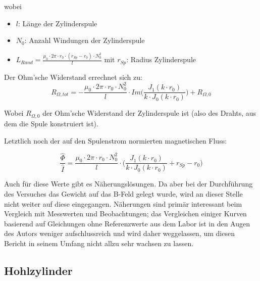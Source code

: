 wobei
\begin{itemize}
    \item[]
        $l$: L\"ange der Zylinderspule
    \item[]
        $N_0$: Anzahl Windungen der Zylinderspule
    \item[]
        $L_{Rand} = \frac{\mu_0 \cdot 2\pi \cdot r_0 \cdot (r_{Sp} - r_0) \cdot N_0^2}{l}$ mit $r_{Sp}$: Radius Zylinderspule
\end{itemize}

Der Ohm'sche Widerstand errechnet sich zu:
\begin{equation}
    \label{eq:vollzylinder:RExact}
    R_{\Omega,tot} = - \frac{\mu_0 \cdot 2\pi \cdot r_0 \cdot N_0^2}{l} \cdot Im \Biggl(\frac{J_1 (k \cdot r_0)}{k \cdot J_0 (k \cdot r_0)} \Biggr) + R_{\Omega,0}
\end{equation}

Wobei $R_{\Omega,0}$ der  Ohm'sche Widerstand der Zylinderspule  ist (also des
Drahts, aus dem die Spule konstruiert ist).

Letztlich noch der auf den Spulenstrom normierten magnetischen Fluss:

\begin{equation}
    \label{eq:vollzylinder:phiExact}
    \frac{\hat{\Phi}}{\hat{I}} = \frac{\mu_0 \cdot 2\pi \cdot r_0 \cdot N_0^2}{l} \cdot \Biggl(\frac{J_1 (k \cdot r_0)}{k \cdot J_0 (k \cdot r_0)} + r_{Sp} - r_0 \Biggr)
\end{equation}


Auch  f\"ur  diese  Werte  gibt  es  N\"aherungsl\"osungen. Da  aber  bei  der
Durchf\"uhrung des Versuches das Gewicht auf  das B-Feld gelegt wurde, wird an
dieser Stelle  nicht weiter auf diese  eingegangen. N\"aherungen sind prim\"ar
interessant beim  Vergleich mit Messwerten und  Beobachtungen; das Vergleichen
einiger Kurven basierend auf Gleichungen  ohne Referenzwerte aus dem Labor ist
in den Augen des Autors weniger aufschlussreich und wird daher weggelassen, um
diesen Bericht in seinem Umfang nicht allzu sehr wachsen zu lassen.


\subsection{Hohlzylinder}
\label{sec:arbgru:subsec:hohlzyliner}


